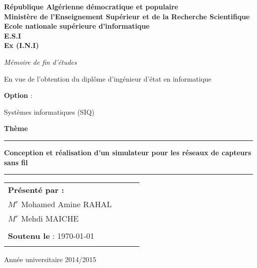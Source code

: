 \sloppy
\begin{titlepage}
\begin{center}
{\bf République Algérienne démocratique et populaire
\\ Ministère de l'Enseignement Supérieur et de la
Recherche Scientifique} \vspace{0.25cm}\\
{\bf {\large Ecole nationale supérieure d'informatique}}\\
{\bf E.S.I } \\ {\bf Ex (I.N.I)}\\

\vspace{3cm}

\Huge{\emph{{{\it {Mémoire de fin d'études }}}}}\\
\vspace{0.1cm}

\normalsize
\begin{center}
En vue de l'obtention du diplôme d'ingénieur d'état en informatique
\end{center}

\normalsize\textbf{Option }:\\
\normalsize
\begin{center}
Systèmes informatiques (SIQ)
\end{center}

\vspace{1.5cm}

\Huge\textbf{Thème}\\
\noindent\rule{\textwidth}{0.5mm}
\Large{{\textbf{Conception et réalisation d'un simulateur pour les réseaux de capteurs sans fil}}}
\noindent\rule{\textwidth}{1mm}
\end{center}
\begin{center}
\normalsize %
\vspace{1.5cm}
\begin{tabular}{llll}



\hspace{6cm}\textbf{\textbf{Présenté par :}}&\\
\hspace{5.9cm} $M^{r}$  Mohamed Amine RAHAL &\\
\hspace{5.9cm} $M^{r}$  Mehdi MAICHE &\\
&\\
\hspace{6.1cm}\textbf{Soutenu le }: \today
&\\\\

\end{tabular}
\end{center}
\vspace{0.1cm}
\begin{center}

Année universitaire 2014/2015
\end{center}
\end{titlepage}